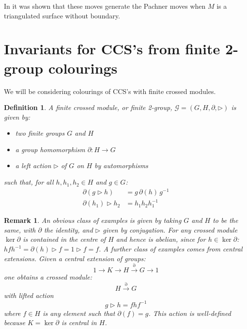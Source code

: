 \documentclass[a4paper,11pt]{article}
\newtheorem{Definition}[Theorem]{Definition}
\newtheorem{Remark}[Theorem]{Remark}
\def \tr {\triangleright}
\def \G {\mathcal{G}}
\begin{document}
In \cite{bp1} it was shown that these moves generate the Pachner moves when $M$ is a triangulated surface without boundary.

\section{Invariants for CCS's from finite 2-group colourings}

\label{sec:inv}

We will be considering colourings of CCS's with finite crossed modules.

\begin{Definition}

A finite crossed module, or finite 2-group, $\G = (G,H, \partial, \triangleright)$ is given by:
\begin{itemize}
\item two finite groups $G$ and $H$
\item a group homomorphism $\partial : H \rightarrow G$
\item a left action $\triangleright$ of $G$ on $H$ by automorphisms
\end{itemize} 
such that, for all $h, h_1,h_2 \in H$ and $g \in G$:
\begin{align}
\partial(g \triangleright h) &= g \, \partial(h) \, g^{-1}\\
\partial(h_1) \triangleright h_2 &= h_1 h_2 h_1^{-1}
\end{align}
\label{def:2group}
\end{Definition}

\begin{Remark}An obvious class of examples is given by taking $G$ and $H$ to be the same, with  $\partial$ the identity, and $\tr$ given by conjugation. 
For any crossed module $\ker \partial$ is contained in the centre of $H$ and hence is abelian, since for $h\in \ker \partial$:  $ hfh^{-1}= \partial(h) \tr f = 1\tr f = f$.
A further class of examples comes from central extensions. Given a central extension of groups: 
$$
1\rightarrow K \rightarrow H \stackrel{\partial}{\rightarrow} G \rightarrow 1 
$$
one obtains a crossed module:
 $$
H \stackrel{\partial}{\longrightarrow} G
$$ 
with lifted action 
$$
g\tr h= fhf^{-1}
$$
where $f\in H$ is any element  such that $\partial(f)=g$. This action is well-defined 
because $K=\ker \partial$ is central in $H$.
\end{Remark}
\end{document}
